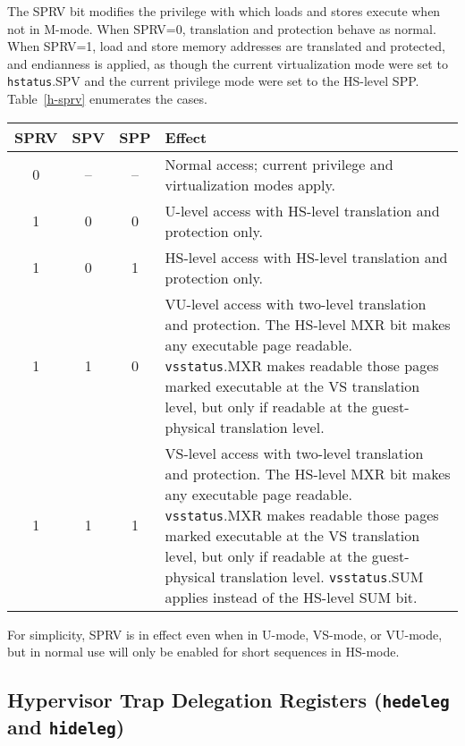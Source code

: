 The SPRV bit modifies the privilege with which loads and stores execute when
not in M-mode.
When SPRV=0, translation and protection behave as normal.
When SPRV=1, load and store memory addresses are translated and protected, and
endianness is applied, as though the current virtualization mode were set to
{\tt hstatus}.SPV and the current privilege mode were set to the HS-level SPP.
Table~\ref{h-sprv} enumerates the cases.

\begin{table*}[h!]
\begin{center}
\begin{tabular}{|c|c|c||p{4.7in}|}
  \hline
   SPRV & SPV & SPP & Effect \\ \hline \hline
   0    & --  & --  & Normal access; current privilege and virtualization modes apply. \\ \hline
   1    & 0   & 0   & U-level access with HS-level translation and protection only. \\ \hline
   1    & 0   & 1   & HS-level access with HS-level translation and protection only. \\ \hline
   1    & 1   & 0   & VU-level access with two-level translation and protection. The HS-level MXR bit makes any executable page readable.  {\tt vsstatus}.MXR makes readable those pages marked executable at the VS translation level, but only if readable at the guest-physical translation level. \\ \hline
   1    & 1   & 1   & VS-level access with two-level translation and protection. The HS-level MXR bit makes any executable page readable.  {\tt vsstatus}.MXR makes readable those pages marked executable at the VS translation level, but only if readable at the guest-physical translation level.  {\tt vsstatus}.SUM applies instead of the HS-level SUM bit. \\ \hline
 \end{tabular}
\end{center}
\caption{Effect of SPRV on load and store translation and protection.}
\label{h-sprv}
\end{table*}

\begin{commentary}
For simplicity, SPRV is in effect even when in U-mode, VS-mode, or VU-mode, but
in normal use will only be enabled for short sequences in HS-mode.
\end{commentary}

\subsection{Hypervisor Trap Delegation Registers ({\tt hedeleg} and {\tt hideleg})}

